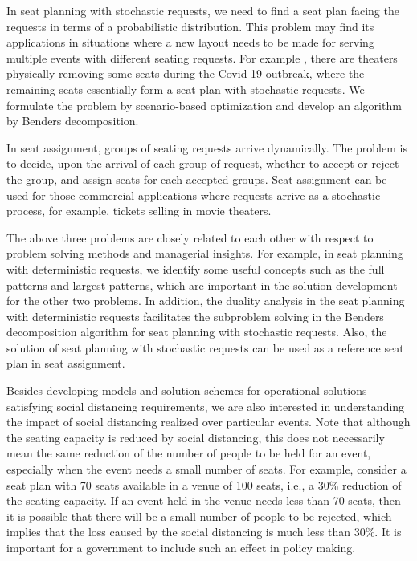 In seat planning with stochastic requests, we need to find a seat plan facing the requests in terms of a probabilistic distribution. This problem may find its applications in situations where a new layout needs to be made for serving multiple events with different seating requests. For example  \cite{Berlin_theater}, there are theaters physically removing some seats during the Covid-19 outbreak, where the remaining seats essentially form a seat plan with stochastic requests. We formulate the problem by scenario-based optimization and develop an algorithm by Benders decomposition.

In seat assignment, groups of seating requests arrive dynamically. The problem is to decide, upon the arrival of each group of request, whether to accept or reject the group, and assign seats for each accepted groups. Seat assignment can be used for those commercial applications where requests arrive as a stochastic process, for example, tickets selling in movie theaters.

The above three problems are closely related to each other with respect to problem solving methods and managerial insights. For example, in seat planning with deterministic requests, we identify some useful concepts such as the full patterns and largest patterns, which are important in the solution development for the other two problems. In addition, the duality analysis in the seat planning with deterministic requests facilitates the subproblem solving in the Benders decomposition algorithm for seat planning with stochastic requests. Also, the solution of seat planning with stochastic requests can be used  as a reference seat plan in seat assignment.


Besides developing models and solution schemes for operational solutions satisfying  social distancing requirements, we are also interested in understanding the impact of social  distancing realized over  particular events. Note that although the seating capacity  is reduced by social distancing, this does not necessarily mean the same reduction of the number of people to be held for an event, especially when the event  needs a small number of seats. For example, consider a seat plan with 70 seats available in a venue of 100 seats, i.e., a 30\% reduction of the seating capacity. If an event held in the venue needs less than 70 seats, then it is possible that there will be a small number of people to be rejected, which implies that the loss caused by the social distancing is much less than 30\%. It is important for a government to include such an effect in policy making.

